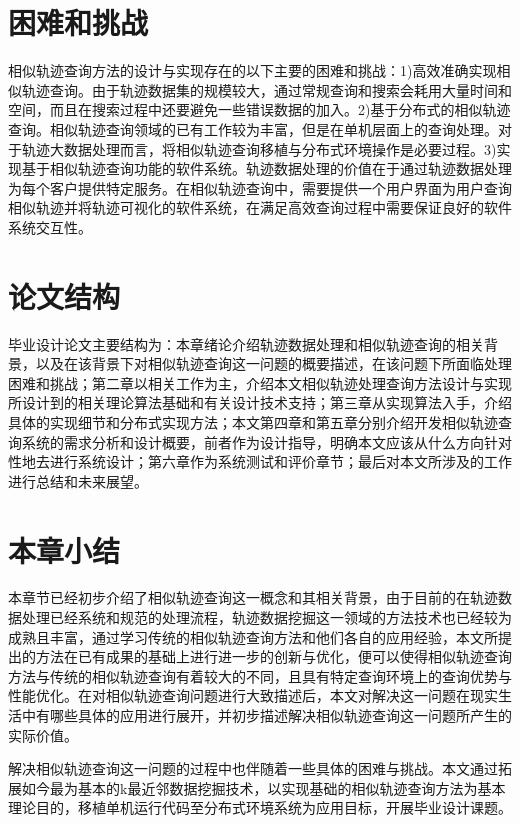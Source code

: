 \section{困难和挑战}
\label{sec:difficulty}
相似轨迹查询方法的设计与实现存在的以下主要的困难和挑战：1)高效准确实现相似轨迹查询。由于轨迹数据集的规模较大，通过常规查询和搜索会耗用大量时间和空间，而且在搜索过程中还要避免一些错误数据的加入。2)基于分布式的相似轨迹查询。相似轨迹查询领域的已有工作较为丰富，但是在单机层面上的查询处理。对于轨迹大数据处理而言，将相似轨迹查询移植与分布式环境操作是必要过程。3)实现基于相似轨迹查询功能的软件系统。轨迹数据处理的价值在于通过轨迹数据处理为每个客户提供特定服务。在相似轨迹查询中，需要提供一个用户界面为用户查询相似轨迹并将轨迹可视化的软件系统，在满足高效查询过程中需要保证良好的软件系统交互性。

\section{论文结构}
\label{sec:requirements}
毕业设计论文主要结构为：本章绪论介绍轨迹数据处理和相似轨迹查询的相关背景，以及在该背景下对相似轨迹查询这一问题的概要描述，在该问题下所面临处理困难和挑战；第二章以相关工作为主，介绍本文相似轨迹处理查询方法设计与实现所设计到的相关理论算法基础和有关设计技术支持；第三章从实现算法入手，介绍具体的实现细节和分布式实现方法；本文第四章和第五章分别介绍开发相似轨迹查询系统的需求分析和设计概要，前者作为设计指导，明确本文应该从什么方向针对性地去进行系统设计；第六章作为系统测试和评价章节；最后对本文所涉及的工作进行总结和未来展望。
\\

\section{本章小结}
\label{sec:requirements}
本章节已经初步介绍了相似轨迹查询这一概念和其相关背景，由于目前的在轨迹数据处理已经系统和规范的处理流程，轨迹数据挖掘这一领域的方法技术也已经较为成熟且丰富，通过学习传统的相似轨迹查询方法和他们各自的应用经验，本文所提出的方法在已有成果的基础上进行进一步的创新与优化，便可以使得相似轨迹查询方法与传统的相似轨迹查询有着较大的不同，且具有特定查询环境上的查询优势与性能优化。在对相似轨迹查询问题进行大致描述后，本文对解决这一问题在现实生活中有哪些具体的应用进行展开，并初步描述解决相似轨迹查询这一问题所产生的实际价值。

解决相似轨迹查询这一问题的过程中也伴随着一些具体的困难与挑战。本文通过拓展如今最为基本的k最近邻数据挖掘技术，以实现基础的相似轨迹查询方法为基本理论目的，移植单机运行代码至分布式环境系统为应用目标，开展毕业设计课题。


